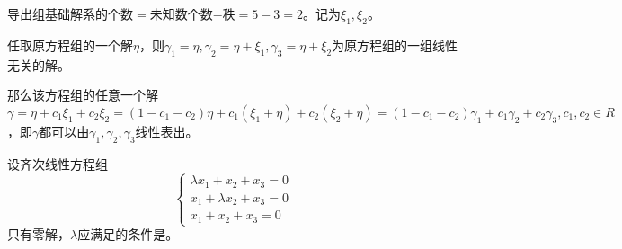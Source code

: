 \documentclass[a4paper]{report}
\begin{document}
\begin{zhengming}
导出组基础解系的个数$=$未知数个数$-$秩$=5-3=2$。记为$\xi_1,\xi_2$。

任取原方程组的一个解$\eta$，则$\gamma_1=\eta,\gamma_2=\eta+\xi_1,\gamma_3=\eta+\xi_2$为原方程组的一组线性无关的解。

那么该方程组的任意一个解$\gamma = \eta+c_1\xi_1+c_2\xi_2=(1-c_1-c_2)\eta+c_1(\xi_1+\eta)+c_2(\xi_2+\eta)=(1-c_1-c_2)\gamma_1+c_1\gamma_2+c_2\gamma_3,c_1,c_2\in R$，即$\gamma$都可以由$\gamma_1,\gamma_2,\gamma_3$线性表出。
\end{zhengming}

\EX 设齐次线性方程组
\begin{equation*}
\begin{cases}
\lambda x_1+x_2+x_3=0\\
x_1+\lambda x_2+x_3=0\\
x_1+x_2+x_3=0
\end{cases}
\end{equation*}
只有零解，$\lambda$应满足的条件是\underline{\hphantom{~~~~~~~~~~~~~~}}。
\end{document}
